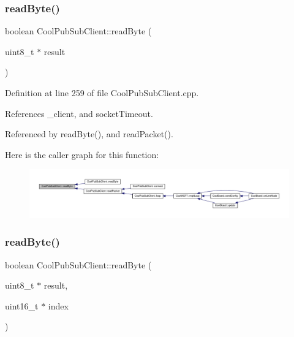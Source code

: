 \subsubsection{\texorpdfstring{read\+Byte()}{readByte()}\hspace{0.1cm}{\footnotesize\ttfamily [1/2]}}
{\footnotesize\ttfamily boolean Cool\+Pub\+Sub\+Client\+::read\+Byte (\begin{DoxyParamCaption}\item[{uint8\+\_\+t $\ast$}]{result }\end{DoxyParamCaption})\hspace{0.3cm}{\ttfamily [private]}}



Definition at line 259 of file Cool\+Pub\+Sub\+Client.\+cpp.



References \+\_\+client, and socket\+Timeout.



Referenced by read\+Byte(), and read\+Packet().

Here is the caller graph for this function\+:
\nopagebreak
\begin{figure}[H]
\begin{center}
\leavevmode
\includegraphics[width=350pt]{d8/d4b/class_cool_pub_sub_client_ad409bbd287d5894f0cf082f62446c002_icgraph}
\end{center}
\end{figure}
\mbox{\label{class_cool_pub_sub_client_abef3735bb9a2a8c87b3da659dc4ade03}} 
\subsubsection{\texorpdfstring{read\+Byte()}{readByte()}\hspace{0.1cm}{\footnotesize\ttfamily [2/2]}}
{\footnotesize\ttfamily boolean Cool\+Pub\+Sub\+Client\+::read\+Byte (\begin{DoxyParamCaption}\item[{uint8\+\_\+t $\ast$}]{result,  }\item[{uint16\+\_\+t $\ast$}]{index }\end{DoxyParamCaption})\hspace{0.3cm}{\ttfamily [private]}}



